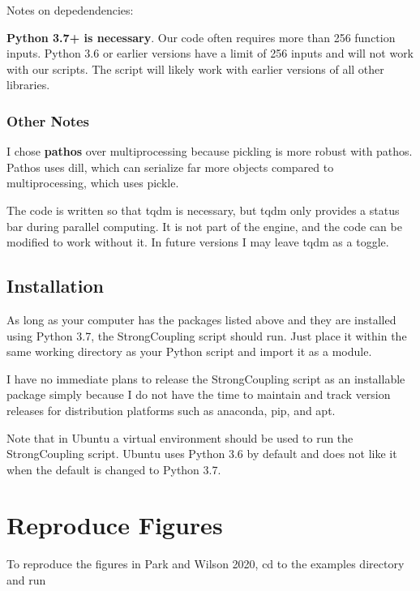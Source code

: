 \documentclass[english,a4paper,oneside]{article}
\begin{document}
Notes on depedendencies:

\textbf{Python 3.7+ is necessary}. Our code often requires more than 256
function inputs. Python 3.6 or earlier versions have a limit of 256
inputs and will not work with our scripts. The script will likely work
with earlier versions of all other libraries.

\hypertarget{other-notes}{%
\subsubsection{Other Notes}\label{other-notes}}

I chose \textbf{pathos} over multiprocessing because pickling is more
robust with pathos. Pathos uses dill, which can serialize far more
objects compared to multiprocessing, which uses pickle.

The code is written so that tqdm is necessary, but tqdm only provides a
status bar during parallel computing. It is not part of the engine, and
the code can be modified to work without it. In future versions I may
leave tqdm as a toggle.

\hypertarget{installation}{%
\subsection{Installation}\label{installation}}

As long as your computer has the packages listed above and they are
installed using Python 3.7, the StrongCoupling script should run. Just
place it within the same working directory as your Python script and
import it as a module.

I have no immediate plans to release the StrongCoupling script as an
installable package simply because I do not have the time to maintain
and track version releases for distribution platforms such as anaconda,
pip, and apt.

Note that in Ubuntu a virtual environment should be used to run the
StrongCoupling script. Ubuntu uses Python 3.6 by default and does not
like it when the default is changed to Python 3.7.

\hypertarget{reproduce-figures}{%
\section{Reproduce Figures}\label{reproduce-figures}}

To reproduce the figures in Park and Wilson 2020, cd to the examples
directory and run
\end{document}
